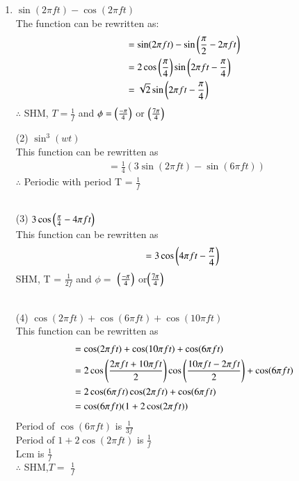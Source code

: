 \documentclass[journal,12pt,twocolumn]{IEEEtran}
\theoremstyle{remark}
\begin{document}
   \begin{enumerate}
\item $\sin(2\pi f t)- \cos(2\pi f t)$\\
The function can be rewritten as:
 \begin{align}
  &= \sin(2\pi f t) - \sin\left(\frac{\pi}{2} - 2\pi f t\right)\\
  &=2 \cos\left(\frac{\pi}{4}\right) \sin\left(2\pi f t - \frac{\pi}{4}\right)\\
  &=\sqrt{2}\sin\left(2\pi f t - \frac{\pi}{4}\right)
 \end{align}
 \(\therefore\) SHM, \(T = \frac{1}{f}\) and \(\phi = \left(\frac{-\pi}{4}\right)\) or \(\left(\frac{7\pi}{4}\right)\)\\
 

    \item[(2)] $\sin^3(wt)$\\

 This function can be rewritten as\\ 
 \begin{align}
  &=\frac{1}{4}(3\sin(2\pi f t)-\sin(6\pi  f t))
 \end{align}
 $\therefore$ Periodic with period {T} = $\frac{1}{f}$ \\
\\

    \item[(3)] $3\cos\left(\frac{\pi}{4}-4\pi f t\right)$\\

This function can be rewritten as\\ 
 \begin{align}
  =3\cos\left(4\pi f t-\frac{\pi}{4}\right)\\
 \end{align}
 SHM, {T} = $\frac{1}{2f}$  and  $\phi=$  $\left(\frac{-\pi}{4}\right)$ or$\left(\frac{7\pi}{4}\right)$\\
 \\

 \item[(4)]  $\cos(2\pi f t)+\cos(6\pi  f t)+\cos(10\pi  f t)$\\

This function can be rewritten as\\ 
 \begin{align}
  &=\cos(2\pi f t)+\cos(10\pi  f t)+\cos(6\pi  f t)\\
  &=2\cos\left(\frac{2\pi f t+10\pi f t}{2}\right)\cos\left(\frac{10\pi  f t-2\pi f t}{2}\right) +\cos(6\pi f t)\\
  &=2\cos(6\pi  f t) \cos(2\pi f t)+\cos(6\pi  f t)\\
  &=\cos(6\pi  f t) (1+2\cos(2\pi f t))
 \end{align}
 Period of $\cos(6\pi  f t)$ is $\frac{1}{3f}$\\ 
 Period of $1+2\cos(2\pi f t)$ is $\frac{1}{f}$\\ 
 Lcm is $\frac{1}{f}$\\
 $\therefore$  SHM,$T=$ $\frac{1}{f}$\\
 \\


\end{enumerate}
\end{document}

